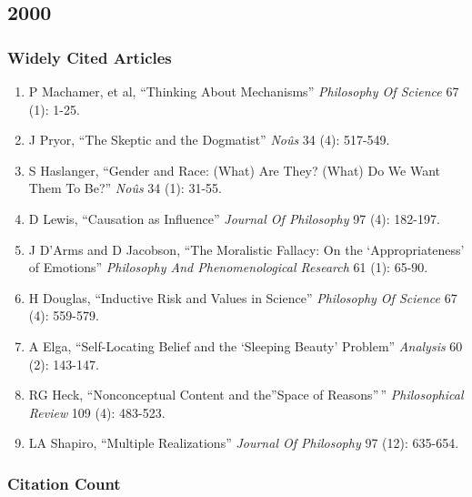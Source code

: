 \documentclass[
  10pt,
  letterpaper,
  DIV=11,
  numbers=noendperiod,
  twoside]{scrartcl}
\providecommand{\tightlist}{%
  \setlength{\itemsep}{0pt}\setlength{\parskip}{0pt}}\usepackage{longtable,booktabs,array}
\begin{document}
\newpage

\subsection{2000}\label{section-24}

\subsubsection*{Widely Cited Articles}\label{widely-cited-articles-24}

\begin{enumerate}
\def\labelenumi{\arabic{enumi}.}
\tightlist
\item
  P Machamer, et al, ``Thinking About Mechanisms'' \emph{Philosophy Of
  Science} 67 (1): 1-25.
\item
  J Pryor, ``The Skeptic and the Dogmatist'' \emph{Noûs} 34 (4):
  517-549.
\item
  S Haslanger, ``Gender and Race: (What) Are They? (What) Do We Want
  Them To Be?'' \emph{Noûs} 34 (1): 31-55.
\item
  D Lewis, ``Causation as Influence'' \emph{Journal Of Philosophy} 97
  (4): 182-197.
\item
  J D'Arms and D Jacobson, ``The Moralistic Fallacy: On the
  `Appropriateness' of Emotions'' \emph{Philosophy And Phenomenological
  Research} 61 (1): 65-90.
\item
  H Douglas, ``Inductive Risk and Values in Science'' \emph{Philosophy
  Of Science} 67 (4): 559-579.
\item
  A Elga, ``Self-Locating Belief and the `Sleeping Beauty' Problem''
  \emph{Analysis} 60 (2): 143-147.
\item
  RG Heck, ``Nonconceptual Content and the''Space of Reasons''\,''
  \emph{Philosophical Review} 109 (4): 483-523.
\item
  LA Shapiro, ``Multiple Realizations'' \emph{Journal Of Philosophy} 97
  (12): 635-654.
\end{enumerate}

\subsubsection*{Citation Count}\label{citation-count-24}
\end{document}
